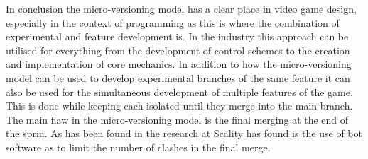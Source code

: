 \documentclass{scrartcl}
\begin{document}
In conclusion the micro-versioning model has a clear place in video game design, especially in the context of programming as this is where the combination of experimental and feature development is. In the industry this approach can be utilised for everything from the development of control schemes to the creation and implementation of core mechanics. In addition to how the micro-versioning model can be used to develop experimental branches of the same feature it can also be used for the simultaneous development of multiple features of the game. This is done while keeping each isolated until they merge into the main branch. The main flaw in the micro-versioning model is the final merging at the end of the sprin\cite{phillips2011branching}. As has been found in the research at Scality has found is the use of bot software as to limit the number of clashes in the final merge\cite{GitWaterFlow}. 
\newpage
{}

\end{document}
